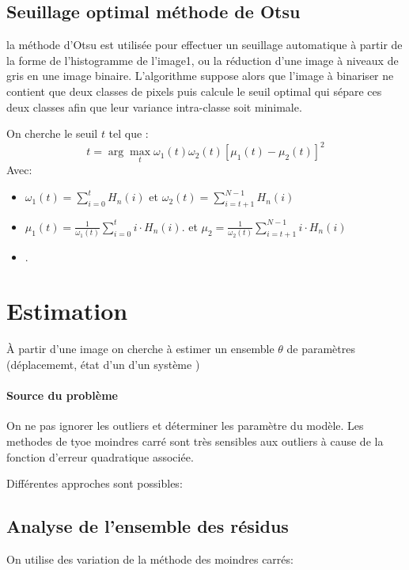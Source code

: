 \documentclass[main.tex]{subfiles}
\begin{document}
\subsection{Seuillage optimal méthode de Otsu}

la méthode d'Otsu est utilisée pour effectuer un seuillage automatique à partir de la forme de l'histogramme de l'image1, ou la réduction d'une image à niveaux de gris en une image binaire. L'algorithme suppose alors que l'image à binariser ne contient que deux classes de pixels  puis calcule le seuil optimal qui sépare ces deux classes afin que leur variance intra-classe soit minimale.

\begin{prop}
  On cherche le seuil $t$ tel que :
  \[
     t = \arg\max_{t} \omega_1(t)\omega_2(t)[\mu_1(t)-\mu_2(t)]^2
  \]
  Avec:
  \begin{itemize}
  \item $\omega_1(t) = \sum_{i=0}^{t}H_n(i)$ et $\omega_2(t)= \sum_{i=t+1}^{N-1}H_n(i)$
  \item $\mu_1(t) = \frac{1}{\omega_1(t)}\sum_{i=0}^{t} i \cdot H_n(i)$. et $\mu_2 =  \frac{1}{\omega_2(t)}\sum_{i=t+1}^{N-1} i \cdot H_n(i)$
  \item .
  \end{itemize}
\end{prop}
\section{Estimation}

À partir d'une image on cherche à estimer un ensemble $\theta$ de paramètres (déplacememt, état d'un d'un système )

\paragraph{Source du problème}
On ne pas ignorer les outliers et déterminer les paramètre du modèle. Les methodes de tyoe moindres carré sont très sensibles aux outliers à cause de la fonction d'erreur quadratique associée.

Différentes approches sont possibles:

\subsection{Analyse de l'ensemble des résidus}

On utilise des variation de la méthode des moindres carrés:
\end{document}
